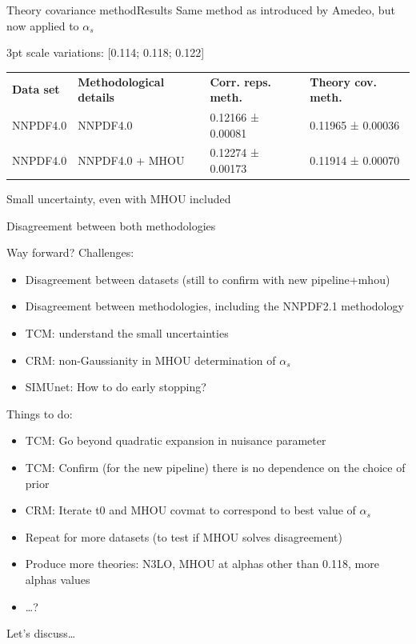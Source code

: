 \documentclass[aspectratio=169, 8pt,t]{beamer}
\begin{document}
\begin{frame}{Theory covariance method}{Results}
  Same method as introduced by Amedeo, but now applied to $\alpha_s$

  \vspace*{0.5em}
  3pt scale variations: [0.114; 0.118; 0.122]

  \vspace*{2em}

  \begin{table}[]
    \begin{tabular}{llll}
    \textbf{Data set} & \textbf{Methodological details} & \textbf{Corr. reps. meth.} & \textbf{Theory cov. meth.}       \\
    NNPDF4.0          & NNPDF4.0                        & 0.12166 ± 0.00081          & {0.11965 ± 0.00036} \\
    NNPDF4.0          & NNPDF4.0 + MHOU                 & 0.12274 ± 0.00173          & {0.11914 ± 0.00070}
    \end{tabular}
  \end{table}

  \vspace*{1em}
  Small uncertainty, even with MHOU included

  \vspace*{0.5em}
  Disagreement between both methodologies

\end{frame}



\begin{frame}{Way forward?}
  Challenges:
  \begin{itemize}
    \item Disagreement between datasets (still to confirm with new pipeline+mhou)
    \item Disagreement between methodologies, including the NNPDF2.1 methodology
    \item TCM: understand the small uncertainties
    \item CRM: non-Gaussianity in MHOU determination of $\alpha_s$
    \item SIMUnet: How to do early stopping?
  \end{itemize}

  Things to do:
  \begin{itemize}
    \item TCM: Go beyond quadratic expansion in nuisance parameter
    \item TCM: Confirm (for the new pipeline) there is no dependence on the choice of prior
    \item CRM: Iterate t0 and MHOU covmat to correspond to best value of $\alpha_s$
    \item Repeat for more datasets (to test if MHOU solves disagreement)
    \item Produce more theories: N3LO, MHOU at alphas other than 0.118, more alphas values
    \item \ldots?
  \end{itemize}

  Let's discuss\ldots
\end{frame}
\end{document}
